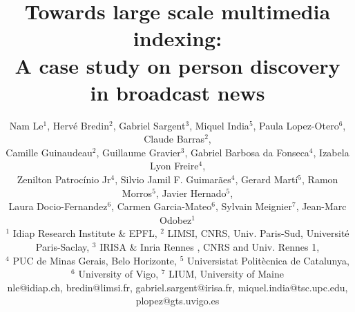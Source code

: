 \documentclass[10pt,conference,a4paper]{IEEEtran}
\begin{document}
%

\title{Towards large scale multimedia indexing: \\ A case study on person discovery in broadcast news}
%


\author{
Nam Le$^1$, Herv\'{e} Bredin$^2$, Gabriel Sargent$^3$, Miquel India$^5$, Paula Lopez-Otero$^6$, Claude Barras$^2$, \\
Camille Guinaudeau$^2$, Guillaume Gravier$^3$, Gabriel Barbosa da Fonseca$^4$, Izabela Lyon Freire$^4$, \\
Zenilton Patroc\'{i}nio Jr$^4$, Silvio Jamil F. Guimarães$^4$, Gerard Martí$^5$, Ramon Morros$^5$, Javier Hernado$^5$, \\
Laura Docio-Fernandez$^6$, Carmen Garcia-Mateo$^6$, Sylvain Meignier$^7$, Jean-Marc Odobez$^1$\\

{\footnotesize $^1$ Idiap Research Institute \& EPFL},
{\footnotesize $^2$ LIMSI, CNRS, Univ. Paris-Sud, Université Paris-Saclay},
{\footnotesize $^3$ IRISA \& Inria Rennes , CNRS and Univ. Rennes 1}, \\
{\footnotesize $^4$ PUC de Minas Gerais, Belo Horizonte},
{\footnotesize $^5$ Universistat Politècnica de Catalunya},
{\footnotesize $^6$ University of Vigo},
{\footnotesize $^7$ LIUM, University of Maine} \\
{\footnotesize nle@idiap.ch, bredin@limsi.fr, gabriel.sargent@irisa.fr, miquel.india@tsc.upc.edu, plopez@gts.uvigo.es}
}

\maketitle





\end{document}
